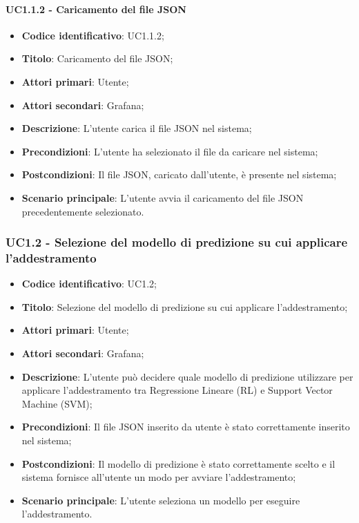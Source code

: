 \paragraph{UC1.1.2 - Caricamento del file JSON}
\begin{itemize}
	\item \textbf{Codice identificativo}: UC1.1.2;
	\item \textbf{Titolo}: Caricamento del file JSON;
	\item \textbf{Attori primari}: Utente;
	\item \textbf{Attori secondari}: Grafana\glo;
	\item \textbf{Descrizione}: L'utente carica il file JSON nel sistema;
	\item \textbf{Precondizioni}: L'utente ha selezionato il file da caricare nel sistema;
	\item \textbf{Postcondizioni}: Il file JSON, caricato dall'utente, è presente nel sistema;
	\item \textbf{Scenario principale}: L'utente avvia il caricamento del file JSON precedentemente selezionato.
\end{itemize}

\subsubsection{UC1.2 - Selezione del modello di predizione su cui applicare l'addestramento}
\begin{itemize}
	\item \textbf{Codice identificativo}: UC1.2;
	\item \textbf{Titolo}: Selezione del modello di predizione su cui applicare l'addestramento;
	\item \textbf{Attori primari}: Utente;
	\item \textbf{Attori secondari}: Grafana\glo;
	\item \textbf{Descrizione}: L'utente può decidere quale modello di predizione utilizzare per applicare l'addestramento tra Regressione Lineare (RL\glo) e Support Vector Machine (SVM\glo);
	\item \textbf{Precondizioni}: Il file JSON inserito da utente è stato correttamente inserito nel sistema;
	\item \textbf{Postcondizioni}: Il modello di predizione è stato correttamente scelto e il sistema fornisce all'utente un modo per avviare l'addestramento;
	\item \textbf{Scenario principale}: L'utente seleziona un modello per eseguire l'addestramento.
\end{itemize}

